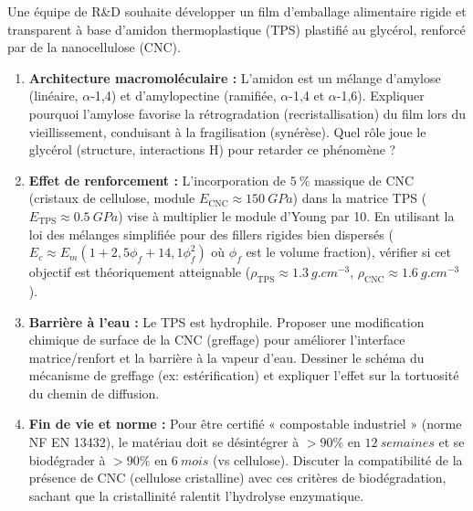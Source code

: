 \documentclass[11pt]{article}
\begin{document}
\begin{exercice}
Une équipe de R\&D souhaite développer un film d'emballage alimentaire rigide et transparent à base d'amidon thermoplastique (TPS) plastifié au glycérol, renforcé par de la nanocellulose (CNC).
\begin{enumerate}
    \item \textbf{Architecture macromoléculaire :} L'amidon est un mélange d'amylose (linéaire, $\alpha$-1,4) et d'amylopectine (ramifiée, $\alpha$-1,4 et $\alpha$-1,6). Expliquer pourquoi l'amylose favorise la rétrogradation (recristallisation) du film lors du vieillissement, conduisant à la fragilisation (synérèse). Quel rôle joue le glycérol (structure, interactions H) pour retarder ce phénomène ?
    \item \textbf{Effet de renforcement :} L'incorporation de $\SI{5}{\%}$ massique de CNC (cristaux de cellulose, module $E_{\text{CNC}} \approx \SI{150}{GPa}$) dans la matrice TPS ($E_{\text{TPS}} \approx \SI{0,5}{GPa}$) vise à multiplier le module d'Young par 10. En utilisant la loi des mélanges simplifiée pour des fillers rigides bien dispersés ($E_c \approx E_m (1 + 2,5 \phi_f + 14,1 \phi_f^2)$ où $\phi_f$ est le volume fraction), vérifier si cet objectif est théoriquement atteignable ($\rho_{\text{TPS}} \approx \SI{1,3}{g.cm^{-3}}$, $\rho_{\text{CNC}} \approx \SI{1,6}{g.cm^{-3}}$).
    \item \textbf{Barrière à l'eau :} Le TPS est hydrophile. Proposer une modification chimique de surface de la CNC (greffage) pour améliorer l'interface matrice/renfort et la barrière à la vapeur d'eau. Dessiner le schéma du mécanisme de greffage (ex: estérification) et expliquer l'effet sur la tortuosité du chemin de diffusion.
    \item \textbf{Fin de vie et norme :} Pour être certifié « compostable industriel » (norme NF EN 13432), le matériau doit se désintégrer à $>90\%$ en $\SI{12}{semaines}$ et se biodégrader à $>90\%$ en $\SI{6}{mois}$ (vs cellulose). Discuter la compatibilité de la présence de CNC (cellulose cristalline) avec ces critères de biodégradation, sachant que la cristallinité ralentit l'hydrolyse enzymatique.
\end{enumerate}
\end{exercice}
\end{document}
